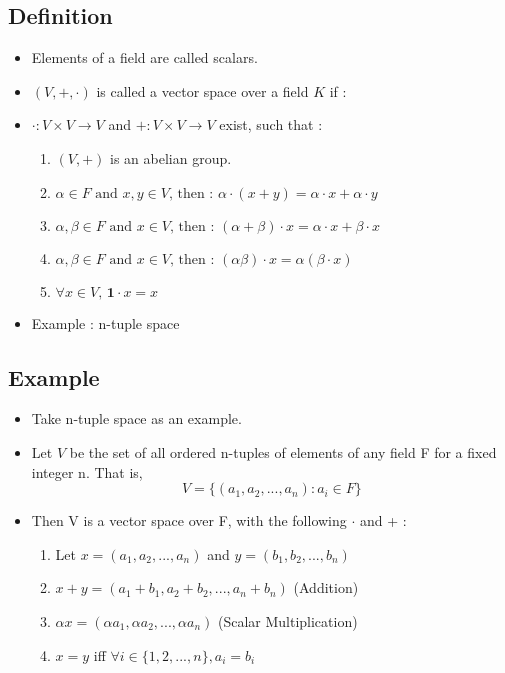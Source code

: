 \documentclass[twoside]{article}
\begin{document}
	\subsection{Definition}
	\begin{itemize}
		\item Elements of a field are called scalars.
		\item $(V,+,\cdot)$ is called a vector space over a field $K$ if :
		\item $\cdot : V \times V \rightarrow V$ and $+ : V \times V \rightarrow V$ exist, such that :
		\begin{enumerate}
			\item $(V, +)$ is an abelian group.
			\item $\alpha \in F \text{ and } x,y \in V \text{, then : } \alpha \cdot (x + y) = \alpha \cdot x + \alpha \cdot y$
			\item $\alpha, \beta \in F \text{ and } x \in V \text{, then : }  ( \alpha + \beta ) \cdot x =  \alpha \cdot x + \beta \cdot x$
			\item $\alpha, \beta \in F \text{ and } x \in V \text{, then : }  ( \alpha  \beta ) \cdot x =  \alpha (\beta \cdot x)$
			\item $\forall x \in V \text{, } \mathbf{1} \cdot x = x$
		\end{enumerate} 
		\item Example : n-tuple space
	\end{itemize}
	
	\subsection{Example}
	\begin{itemize}
		\item Take n-tuple space as an example.
		\item Let $V$ be the set of all ordered n-tuples of elements of any field F for a fixed integer n. That is,
		\[V = \{(a_1, a_2, ..., a_n): a_i \in F\}\]
		\item Then V is a vector space over F, with the following $\cdot$ and + :
		\begin{enumerate}
			\item Let $x = (a_1, a_2, ..., a_n)$ and $y = (b_1, b_2, ..., b_n)$
			\item $x + y = (a_1 + b_1, a_2 + b_2, ..., a_n + b_n)$ (Addition)
			\item $\alpha x = (\alpha a_1, \alpha a_2, ..., \alpha a_n)$ (Scalar Multiplication)
			\item $x = y$ iff $\forall i \in \{1,2,...,n\}, a_i = b_i$
		\end{enumerate}
	\end{itemize}
	
\end{document}
